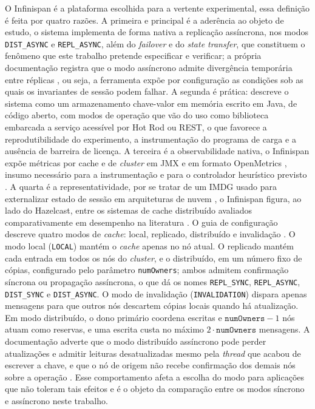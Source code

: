 O Infinispan é a plataforma escolhida para a vertente experimental, essa definição é feita por quatro razões. A primeira e principal é a aderência ao objeto de estudo, o sistema implementa de forma nativa a replicação assíncrona, nos modos \texttt{DIST\_ASYNC} e \texttt{REPL\_ASYNC}, além do \emph{failover} e do \emph{state transfer}, que constituem o fenômeno que este trabalho pretende especificar e verificar; a própria documentação registra que o modo assíncrono admite divergência temporária entre réplicas \citep{infinispan_docs_stable}, ou seja, a ferramenta expõe por configuração as condições sob as quais os invariantes de sessão podem falhar. A segunda é prática: \citet{infinispan_intro} descreve o sistema como um armazenamento chave-valor em memória escrito em Java, de código aberto, com modos de operação que vão do uso como biblioteca embarcada a serviço acessível por Hot Rod ou REST, o que favorece a reprodutibilidade do experimento, a instrumentação do programa de carga e a ausência de barreira de licença. A terceira é a observabilidade nativa, o Infinispan expõe métricas por cache e de \emph{cluster} em JMX \citep{jmx_oracle} e em formato OpenMetrics \citep{openmetrics_spec}, insumo necessário para a instrumentação e para o controlador heurístico previsto \citep{infinispan_metrics}.  A quarta é a representatividade, por se tratar de um IMDG usado para externalizar estado de sessão em arquiteturas de nuvem \citep{armbrust_cloud_2010}, o Infinispan figura, ao lado do Hazelcast, entre os sistemas de cache distribuído avaliados comparativamente em desempenho na literatura \citep{salhi_benchmarking_cache_2018}. O guia de configuração descreve quatro modos de \emph{cache}: local, replicado, distribuído e invalidação \cite[seção 1.3]{infinispan_configuring_15}. O modo local (\texttt{LOCAL}) mantém o \emph{cache} apenas no nó atual. O replicado mantém cada entrada em todos os nós do \emph{cluster}, e o distribuído, em um número fixo de cópias, configurado pelo parâmetro \texttt{numOwners}; ambos admitem confirmação síncrona ou propagação assíncrona, o que dá os nomes \texttt{REPL\_SYNC}, \texttt{REPL\_ASYNC}, \texttt{DIST\_SYNC} e \texttt{DIST\_ASYNC}. O modo de invalidação (\texttt{INVALIDATION}) dispara apenas mensagens para que outros nós descartem cópias locais quando há atualização. Em modo distribuído, o dono primário coordena escritas e $\texttt{numOwners} - 1$ nós atuam como reservas, e uma escrita custa no máximo $2 \cdot \texttt{numOwners}$ mensagens. A documentação adverte que o modo distribuído assíncrono pode perder atualizações e admitir leituras desatualizadas mesmo pela \emph{thread} que acabou de escrever a chave, e que o nó de origem não recebe confirmação dos demais nós sobre a operação \cite[seções 2.2 e 2.4]{infinispan_configuring_15}. Esse comportamento afeta a escolha do modo para aplicações que não toleram tais efeitos e é o objeto da comparação entre os modos síncrono e assíncrono neste trabalho.

